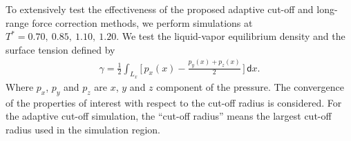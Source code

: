 \documentclass[aps,pre,preprint]{revtex4}
\renewcommand{\d}[1]{\textsf{#1}}
\begin{document}

To extensively test the effectiveness of the proposed adaptive cut-off
and long-range force correction methods, we perform simulations at
$T^\ast = 0.70,\ 0.85,\ 1.10,\ 1.20$.  We test the liquid-vapor
equilibrium density and the surface tension defined by
\begin{align}
  \gamma = \frac12 \int_{L_x}
  \bigg[\,
  p_x(x) - \frac{p_y(x) + p_z(x)}{2}
  \,\bigg]
  \,\d dx.
\end{align}
Where $p_x$, $p_y$ and $p_z$ are $x$, $y$ and $z$ component of the
pressure. The convergence of the properties of interest with respect
to the cut-off radius is considered.  For the adaptive cut-off
simulation, the ``cut-off radius'' means the largest cut-off radius
used in the simulation region. 
\end{document}
